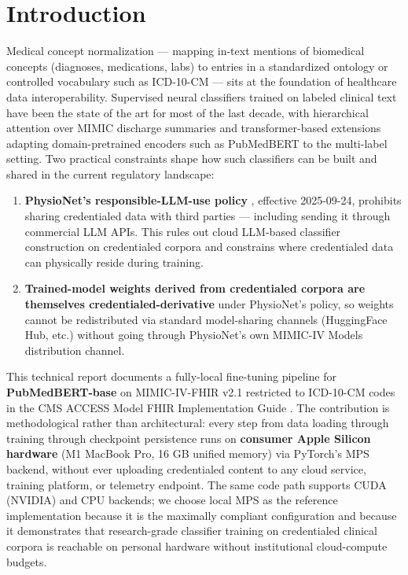 \section{Introduction}\label{introduction}

Medical concept normalization --- mapping in-text mentions of
biomedical concepts (diagnoses, medications, labs) to entries in
a standardized ontology or controlled vocabulary such as ICD-10-CM
\autocite{Miftahutdinov2021,Xu2022} --- sits at the foundation of
healthcare data interoperability. Supervised neural classifiers
trained on labeled clinical text have been the state of the art for
most of the last decade, with hierarchical attention over MIMIC
discharge summaries \autocite{Mullenbach2018} and transformer-based
extensions adapting domain-pretrained encoders such as PubMedBERT
\autocite{Gu2021,Huang2022} to the multi-label setting. Two practical
constraints shape how such classifiers can be built and shared in
the current regulatory landscape:

\begin{enumerate}
\def\labelenumi{\arabic{enumi}.}
\tightlist
\item
  \textbf{PhysioNet's responsible-LLM-use policy} \autocite{PhysioNet2025},
  effective 2025-09-24, prohibits sharing credentialed data with
  third parties --- including sending it through commercial LLM APIs.
  This rules out cloud LLM-based classifier construction on
  credentialed corpora and constrains where credentialed data can
  physically reside during training.
\item
  \textbf{Trained-model weights derived from credentialed corpora are
  themselves credentialed-derivative} under PhysioNet's policy, so
  weights cannot be redistributed via standard model-sharing
  channels (HuggingFace Hub, etc.) without going through PhysioNet's
  own MIMIC-IV Models distribution channel.
\end{enumerate}

This technical report documents a fully-local fine-tuning pipeline
for \textbf{PubMedBERT-base} \autocite{Gu2021} on MIMIC-IV-FHIR v2.1
\autocite{Bennett2024,Bennett2023,Johnson2023} restricted to ICD-10-CM
codes in the CMS ACCESS Model FHIR Implementation Guide \autocite{CMS2026}.
The contribution is methodological rather than architectural: every
step from data loading through training through checkpoint
persistence runs on \textbf{consumer Apple Silicon hardware} (M1
MacBook Pro, 16 GB unified memory) via PyTorch's MPS backend,
without ever uploading credentialed content to any cloud service,
training platform, or telemetry endpoint. The same code path
supports CUDA (NVIDIA) and CPU backends; we choose local MPS as
the reference implementation because it is the maximally compliant
configuration and because it demonstrates that research-grade
classifier training on credentialed clinical corpora is reachable
on personal hardware without institutional cloud-compute budgets.

